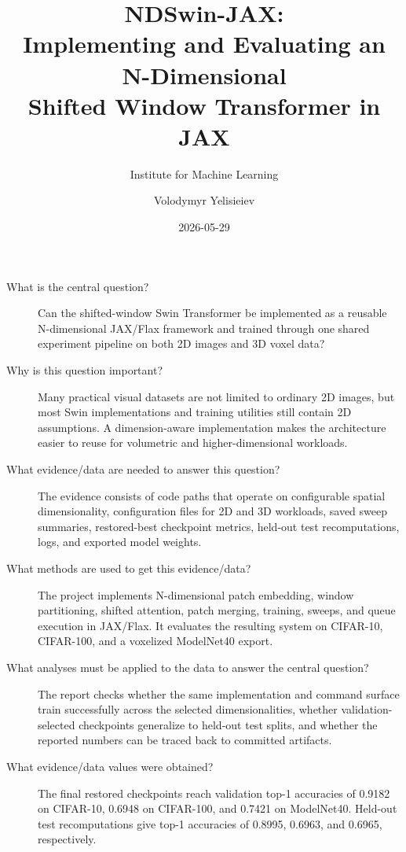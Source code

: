 \documentclass[a4paper,oneside,10pt,english]{scrartcl}
\title{NDSwin-JAX:\texorpdfstring{\\}{ }Implementing and Evaluating an N-Dimensional\texorpdfstring{\\}{ }Shifted Window Transformer in JAX}
\subtitle{Institute for Machine Learning}
\author{Volodymyr Yelisieiev\matno{12340334}}
\date{2026-05-29}
\begin{document}
\maketitle

\cleardoubleoddpage
\tableofcontents

\cleardoubleoddpage
{}


\label{sec:story-summary}
\begin{description}
  \item[What is the central question?]
  Can the shifted-window Swin Transformer be implemented as a reusable N-dimensional JAX/Flax framework and trained through one shared experiment pipeline on both 2D images and 3D voxel data?

  \item[Why is this question important?]
  Many practical visual datasets are not limited to ordinary 2D images, but most Swin implementations and training utilities still contain 2D assumptions. A dimension-aware implementation makes the architecture easier to reuse for volumetric and higher-dimensional workloads.

  \item[What evidence/data are needed to answer this question?]
  The evidence consists of code paths that operate on configurable spatial dimensionality, configuration files for 2D and 3D workloads, saved sweep summaries, restored-best checkpoint metrics, held-out test recomputations, logs, and exported model weights.

  \item[What methods are used to get this evidence/data?]
  The project implements N-dimensional patch embedding, window partitioning, shifted attention, patch merging, training, sweeps, and queue execution in JAX/Flax. It evaluates the resulting system on CIFAR-10, CIFAR-100, and a voxelized ModelNet40 export.

  \item[What analyses must be applied to the data to answer the central question?]
  The report checks whether the same implementation and command surface train successfully across the selected dimensionalities, whether validation-selected checkpoints generalize to held-out test splits, and whether the reported numbers can be traced back to committed artifacts.

  \item[What evidence/data values were obtained?]
  The final restored checkpoints reach validation top-1 accuracies of 0.9182 on CIFAR-10, 0.6948 on CIFAR-100, and 0.7421 on ModelNet40. Held-out test recomputations give top-1 accuracies of 0.8995, 0.6963, and 0.6965, respectively.


\end{description}
\end{document}
